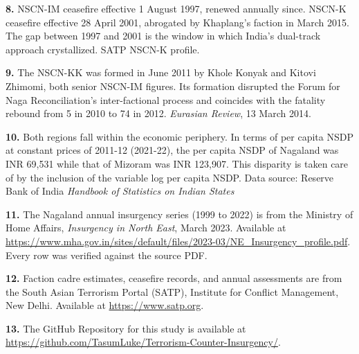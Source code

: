 \documentclass[12pt,a4paper]{article}
\begin{document}
\vspace{0.4em}

\noindent\textbf{8.} NSCN-IM ceasefire effective 1 August 1997, renewed annually since. NSCN-K ceasefire effective 28 April 2001, abrogated by Khaplang's faction in March 2015. The gap between 1997 and 2001 is the window in which India's dual-track approach crystallized. SATP NSCN-K profile.

\vspace{0.4em}

\noindent\textbf{9.} The NSCN-KK was formed in June 2011 by Khole Konyak and Kitovi Zhimomi, both senior NSCN-IM figures. Its formation disrupted the Forum for Naga Reconciliation's inter-factional process and coincides with the fatality rebound from 5 in 2010 to 74 in 2012. \textit{Eurasian Review}, 13 March 2014.

\vspace{0.4em}

\noindent\textbf{10.} Both regions fall within the economic periphery. In terms of per capita NSDP at constant prices of 2011-12 (2021-22), the per capita NSDP of Nagaland was INR 69,531 while that of Mizoram was INR 123,907. This disparity is taken care of by the inclusion of the variable log per capita NSDP. Data source: Reserve Bank of India \textit{Handbook of Statistics on Indian States}

\vspace{0.4em}

\noindent\textbf{11.} The Nagaland annual insurgency series (1999 to 2022) is from the Ministry of Home Affairs, \textit{Insurgency in North East}, March 2023. Available at \url{https://www.mha.gov.in/sites/default/files/2023-03/NE_Insurgency_profile.pdf}. Every row was verified against the source PDF.

\vspace{0.4em}

\noindent\textbf{12.} Faction cadre estimates, ceasefire records, and annual assessments are from the South Asian Terrorism Portal (SATP), Institute for Conflict Management, New Delhi. Available at \url{https://www.satp.org}.
\vspace{0.4em}

\noindent\textbf{13.} The GitHub Repository for this study is available at \url{https://github.com/TasumLuke/Terrorism-Counter-Insurgency/}.
\end{document}
